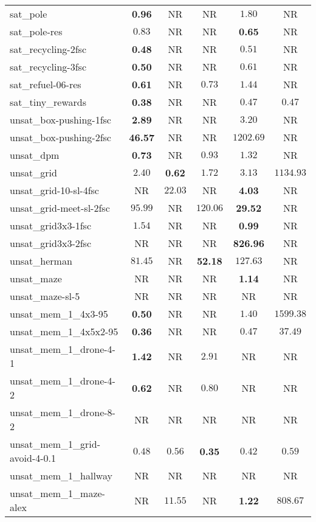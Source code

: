 \begin{tabular}{lccccc}
sat\_pole & \textbf{0.96} & NR & NR & $1.80$ & NR \\
sat\_pole-res & $0.83$ & NR & NR & \textbf{0.65} & NR \\
sat\_recycling-2fsc & \textbf{0.48} & NR & NR & $0.51$ & NR \\
sat\_recycling-3fsc & \textbf{0.50} & NR & NR & $0.61$ & NR \\
sat\_refuel-06-res & \textbf{0.61} & NR & $0.73$ & $1.44$ & NR \\
sat\_tiny\_rewards & \textbf{0.38} & NR & NR & $0.47$ & $0.47$ \\
unsat\_box-pushing-1fsc & \textbf{2.89} & NR & NR & $3.20$ & NR \\
unsat\_box-pushing-2fsc & \textbf{46.57} & NR & NR & $1202.69$ & NR \\
unsat\_dpm & \textbf{0.73} & NR & $0.93$ & $1.32$ & NR \\
unsat\_grid & $2.40$ & \textbf{0.62} & $1.72$ & $3.13$ & $1134.93$ \\
unsat\_grid-10-sl-4fsc & NR & $22.03$ & NR & \textbf{4.03} & NR \\
unsat\_grid-meet-sl-2fsc & $95.99$ & NR & $120.06$ & \textbf{29.52} & NR \\
unsat\_grid3x3-1fsc & $1.54$ & NR & NR & \textbf{0.99} & NR \\
unsat\_grid3x3-2fsc & NR & NR & NR & \textbf{826.96} & NR \\
unsat\_herman & $81.45$ & NR & \textbf{52.18} & $127.63$ & NR \\
unsat\_maze & NR & NR & NR & \textbf{1.14} & NR \\
unsat\_maze-sl-5 & NR & NR & NR & NR & NR \\
unsat\_mem\_1\_4x3-95 & \textbf{0.50} & NR & NR & $1.40$ & $1599.38$ \\
unsat\_mem\_1\_4x5x2-95 & \textbf{0.36} & NR & NR & $0.47$ & $37.49$ \\
unsat\_mem\_1\_drone-4-1 & \textbf{1.42} & NR & $2.91$ & NR & NR \\
unsat\_mem\_1\_drone-4-2 & \textbf{0.62} & NR & $0.80$ & NR & NR \\
unsat\_mem\_1\_drone-8-2 & NR & NR & NR & NR & NR \\
unsat\_mem\_1\_grid-avoid-4-0.1 & $0.48$ & $0.56$ & \textbf{0.35} & $0.42$ & $0.59$ \\
unsat\_mem\_1\_hallway & NR & NR & NR & NR & NR \\
unsat\_mem\_1\_maze-alex & NR & $11.55$ & NR & \textbf{1.22} & $808.67$ \\

\end{tabular}

